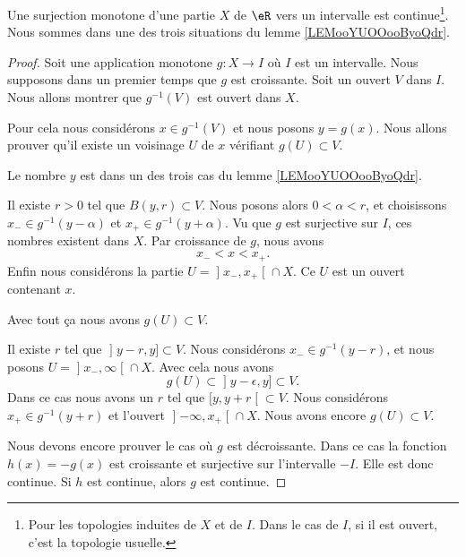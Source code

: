 \begin{proposition} \label{PropOARooUuCaYT}
	Une surjection monotone d'une partie \( X\) de \( \eR\) vers un intervalle est continue\footnote{Pour les topologies induites de \( X\) et de \( I\). Dans le cas de \( I\), si il est ouvert, c'est la topologie usuelle.}. Nous sommes dans une des trois situations du lemme \ref{LEMooYUOOooByoQdr}.
\end{proposition}

\begin{proof}
	Soit une application monotone \(g \colon X\to I  \) où \( I\) est un intervalle. Nous supposons dans un premier temps que \( g\) est croissante. Soit un ouvert \( V\) dans \( I\). Nous allons montrer que \( g^{-1}(V)\) est ouvert dans \( X\).

	Pour cela nous considérons \( x\in g^{-1}(V)\) et nous posons \( y=g(x)\). Nous allons prouver qu'il existe un voisinage \( U\) de \( x\) vérifiant \( g(U)\subset V\).

	Le nombre \( y\) est dans un des trois cas du lemme \ref{LEMooYUOOooByoQdr}.
	\begin{subproof}
		Il existe \( r>0\) tel que \( B(y,r)\subset V\). Nous posons alors \(  0<\alpha<r  \), et choisissons \( x_-\in g^{-1}(y-\alpha)\) et \( x_+\in g^{-1}(y+\alpha) \). Vu que \( g\) est surjective sur \( I\), ces nombres existent dans \( X\). Par croissance de \( g\), nous avons
		\begin{equation}
			x_-<x<x_+.
		\end{equation}
		Enfin nous considérons la partie \( U=\mathopen] x_-,x_+\mathclose[\cap X\). Ce \( U\) est un ouvert contenant \( x\).

			Avec tout ça nous avons \( g(U)\subset V\).

			\spitem[Si \( y=\sup(I)\)]
			Il existe \( r\) tel que \( \mathopen] y-r,y\mathclose]\subset V\). Nous considérons \( x_-\in g^{-1}(y-r)\), et nous posons \( U=\mathopen] x_-,\infty\mathclose[\cap X\). Avec cela nous avons
		\begin{equation}
			g(U)\subset \mathopen] y-\epsilon,y\mathclose]\subset V.
		\end{equation}
		\spitem[Si \( y=\inf(I)\)]
		Dans ce cas nous avons un \( r\) tel que \( \mathopen[ y,y+r\mathclose[\subset V\). Nous considérons \( x_+\in g^{-1}(y+r)\) et l'ouvert \( \mathopen] -\infty,x_+\mathclose[\cap X\). Nous avons encore \( g(U)\subset V\).
	\end{subproof}

	Nous devons encore prouver le cas où \( g\) est décroissante. Dans ce cas la fonction \( h(x)=-g(x)\) est croissante et surjective sur l'intervalle \( -I\). Elle est donc continue. Si \( h\) est continue, alors \( g\) est continue.
\end{proof}

